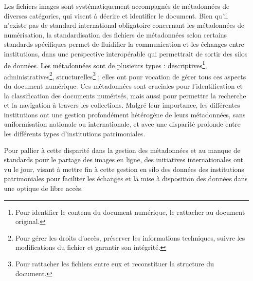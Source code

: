 Les fichiers images sont systématiquement accompagnés de métadonnées de diverses catégories, qui visent à décrire et identifier le document. Bien qu'il n'existe pas de standard international obligatoire concernant les métadonnées de numérisation, la standardisation des fichiers de métadonnées selon certains standards spécifiques permet de fluidifier la communication et les échanges entre institutions, dans une perspective interopérable qui permettrait de sortir des silos de données. Les métadonnées sont de plusieurs types : descriptives\footnote{Pour identifier le contenu du document numérique, le rattacher au document original.}, administratives\footnote{Pour gérer les droits d'accès, préserver les informations techniques, suivre les modifications du fichier et garantir son intégrité.}, structurelles\footnote{Pour rattacher les fichiers entre eux et reconstituer la structure du document.} ; elles ont pour vocation de gérer tous ces aspects du document numérique. Ces métadonnées sont cruciales pour l'identification et la classification des documents numérisés, mais aussi pour permettre la recherche et la navigation à travers les collections. Malgré leur importance, les différentes institutions ont une gestion profondément hétérogène de leurs métadonnées, sans uniformisation nationale ou internationale, et avec une disparité profonde entre les différents types d'institutions patrimoniales.

Pour pallier à cette disparité dans la gestion des métadonnées et au manque de standards pour le partage des images en ligne, des initiatives internationales ont vu le jour, visant à mettre fin à cette gestion en silo des données des institutions patrimoniales pour faciliter les échanges et la mise à disposition des données dans une optique de libre accès.

